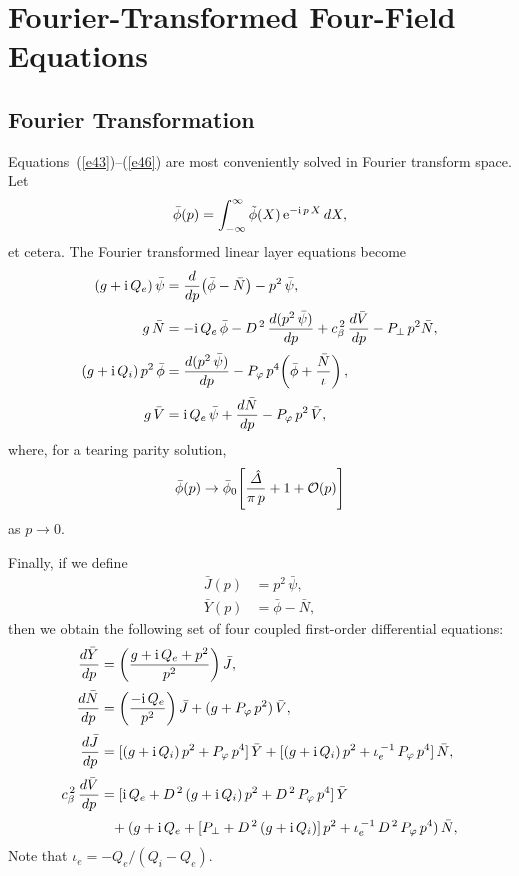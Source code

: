 \documentclass[12pt,prb,aps]{revtex4-1}
\begin{document}
\section{Fourier-Transformed Four-Field Equations}\label{linear}
\subsection{Fourier Transformation}
Equations~(\ref{e43})--(\ref{e46}) are most conveniently solved in Fourier transform space.\cite{cole} 
Let
\begin{equation}
\bar{\phi}(p) = \int_{-\infty}^\infty \tilde{\phi}(X)\,{\rm e}^{-{\rm i}\,p\,X}\,dX,
\end{equation}
et cetera. The Fourier transformed linear layer equations become
\begin{align}\label{e314}
(g+{\rm i}\,Q_e)\,\bar{\psi}&=\frac{d}{dp}\!\left(\bar{\phi}-\bar{N}\right)-p^2\,\bar{\psi},\\[0.5ex]
g\,\bar{N} &= - {\rm i}\,Q_{e}\,\bar{\phi} -D^{\,2}\,\frac{d(p^2\,\bar{\psi})}{dp}+ c_\beta^{\,2}\,\frac{d\bar{V}}{dp}
  - P_\perp\,p^2\bar{N},\label{e316}\\[0.5ex]
(g+{\rm i}\,Q_i)\,p^2\,\bar{\phi}&=  \frac{d(p^2\,\bar{\psi})}{dp}- P_\varphi\,p^4\!\left(\bar{\phi} + \frac{\bar{N}}{\iota}\right),\\[0.5ex]
g\,\bar{V} &= {\rm i}\,Q_{e}\,\bar{\psi} +\frac{d\bar{N}}{dp}- P_\varphi\,p^2\,\bar{V},\label{e317}
\end{align}
where, for a tearing parity solution, 
\begin{equation}\label{e41}
\bar{\phi}(p)\rightarrow \bar{\phi}_0\!\left[\frac{\hat{\mit\Delta}}{\pi\,p} + 1+ {\cal O}(p)\right]
\end{equation}
as $p\rightarrow 0$. 

Finally, if we define 
\begin{align}
\bar{J}(p)&= p^2\,\bar{\psi},\\[0.5ex]
\bar{Y} (p)&= \bar{\phi}-\bar{N},\label{e43}
\end{align}
then we obtain the following set of four coupled first-order differential equations:
\begin{align}\label{e1}
\frac{d\bar{Y}}{dp} &= \left(\frac{g+{\rm i}\,Q_e+p^2}{p^2}\right)\bar{J},\\[0.5ex]
\frac{d\bar{N}}{dp} &= \left(\frac{-{\rm i}\,Q_e}{p^2}\right)\bar{J} + (g + P_\varphi\,p^2)\,\bar{V},\\[0.5ex]
\frac{d\bar{J}}{dp} &= [(g+{\rm i}\,Q_i)\,p^2 + P_\varphi\,p^4]\,\bar{Y}
+ [(g+{\rm i}\,Q_i)\,p^2 + \iota_e^{\,-1}\,P_\varphi\,p^4]\,\bar{N},\\[0.5ex]
c_\beta^{\,2}\,\frac{d\bar{V}}{dp} &= [{\rm i}\,Q_e+ D^{\,2}\,(g+{\rm i}\,Q_i)\,p^2 + D^{\,2}\,P_\varphi\,p^4]\,\bar{Y}
\nonumber\\[0.5ex]&\phantom{=} +(g+{\rm i}\,Q_e + [P_\perp+ D^{\,2}\,(g + {\rm i}\,Q_i)]\,p^2 + \iota_e^{\,-1}\,D^{\,2}\,P_\varphi\,p^4)\,\bar{N},\label{e4}
\end{align}
Note that $\iota_e= -Q_e/(Q_i-Q_e)$. 
\end{document}

